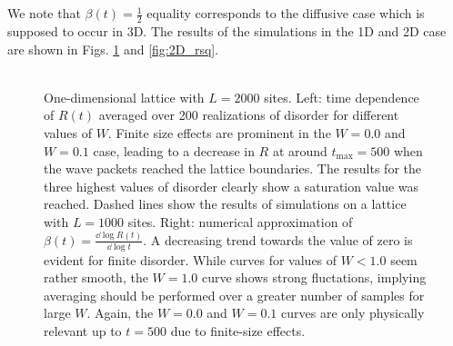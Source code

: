 \documentclass[10pt,a4paper]{article}
\begin{document}
\\\\
\noindent 
We note that $\beta(t)=\frac{1}{2}$ equality corresponds to the diffusive case which is supposed to occur in 3D. The results of the simulations in the 1D and 2D case are shown in Figs. \ref{fig:1D_rsq} and \ref{fig:2D_rsq}.\\\\
\begin{figure}[H]
\caption{One-dimensional lattice with $L=2000$ sites. Left: time dependence of $R(t)$ averaged over 200 realizations of disorder for different values of $W$. Finite size effects are prominent in the $W=0.0$ and $W=0.1$ case, leading to a decrease in $R$ at around $t_\mathrm{max}=500$ when the wave packets reached the lattice boundaries. The results for the three highest values of disorder clearly show a saturation value was reached. Dashed lines show the results of simulations on a lattice with $L=1000$ sites. Right: numerical approximation of $\beta(t)=\frac{\dd \log R(t)}{\dd \log t}$. A decreasing trend towards the value of zero is evident for finite disorder.  While curves for values of $W<1.0$ seem rather smooth, the $W=1.0$ curve shows strong fluctations, implying averaging should be performed over a greater number of samples for large $W$. Again, the $W=0.0$ and $W=0.1$ curves are only physically relevant up to $t=500$ due to finite-size effects. }
\label{fig:1D_rsq} 
\end{figure}
\noindent 
\end{document}
